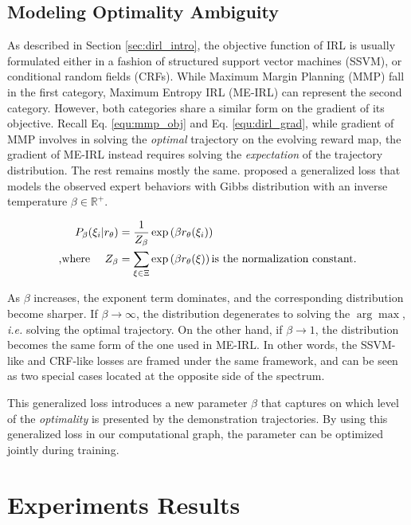 \documentclass[../thesis.tex]{subfiles}
\begin{document}
\subsection{Modeling Optimality Ambiguity}
 
As described in Section \ref{sec:dirl_intro}, the objective function of IRL is usually formulated either in a fashion of structured support vector machines (SSVM), or conditional random fields (CRFs).
While Maximum Margin Planning (MMP) fall in the first category, Maximum Entropy IRL (ME-IRL) can represent the second category.
However, both categories share a similar form on the gradient of its objective.
Recall Eq. \ref{equ:mmp_obj} and Eq. \ref{equ:dirl_grad}, while gradient of MMP involves in solving the \textit{optimal} trajectory on the evolving reward map, the gradient of ME-IRL instead requires solving the \textit{expectation} of the trajectory distribution.
The rest remains mostly the same.
\citet{pletscher2010entropy} proposed a generalized loss that models the observed expert behaviors with Gibbs distribution with an inverse temperature $\beta \in \mathbb R^{+}$.
 
\begin{align}
P_{\beta}(\xi_i | r_\theta) &= \frac{1}{Z_\beta} \exp \left( \beta r_\theta(\xi_i) \right) \\
\text{,where \quad} Z_\beta &= \sum_{\xi \in \Xi} \exp \left( \beta r_\theta(\xi) \right) \text{is the normalization constant.}
\end{align}
 
As $\beta$ increases, the exponent term dominates, and the corresponding distribution become sharper.
If $\beta \to \infty$, the distribution degenerates to solving the $\arg\max$, \textit{i.e.} solving the optimal trajectory.
On the other hand, if $\beta \to 1$, the distribution becomes the same form of the one used in ME-IRL.
In other words, the SSVM-like and CRF-like losses are framed under the same framework, and can be seen as two special cases located at the opposite side of the spectrum.
 
This generalized loss introduces a new parameter $\beta$ that captures on which level of the \textit{optimality} is presented by the demonstration trajectories. By using this generalized loss in our computational graph, the parameter can be optimized jointly during training.
 
\section{Experiments Results}
 
\end{document}
